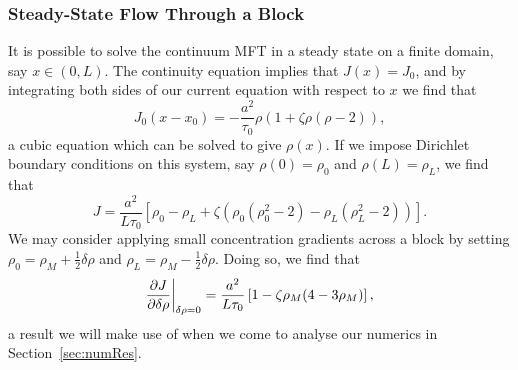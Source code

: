 \subsubsection{Steady-State Flow Through a Block}
It is possible to solve the continuum MFT in a steady state on a finite domain, say $x\in(0, L)$. The continuity equation implies that $J(x)=J_0$, and by integrating both sides of our current equation with respect to $x$ we find that
\begin{equation}
 J_0 (x-x_0) = -\frac{a^2}{\tau_0} \rho \left(1+\zeta \rho\left(\rho-2\right)\right),
\end{equation}
a cubic equation which can be solved to give $\rho(x)$. If we impose Dirichlet boundary conditions on this system, say $\rho(0)=\rho_0$ and $\rho(L)=\rho_L$, we find that
\begin{equation}
 J = \frac{a^2}{L \tau_0} \left[ \rho_0 - \rho_L + \zeta \left( \rho_0\left(\rho_0^2-2\right) - \rho_L\left(\rho_L^2-2\right) \right) \right].
\end{equation}
We may consider applying small concentration gradients across a block by setting $\rho_0 = \rho_M + \frac{1}{2}\delta\rho$ and $\rho_L = \rho_M - \frac{1}{2}\delta\rho$. Doing so, we find that
\begin{equation}
\label{eq:MFTflow}
 \frac{\partial J}{\partial \delta\rho}\bigg|_{\delta\rho=0} = \frac{a^2}{L \tau_0} \left[ 1 - \zeta\rho_M(4-3\rho_M) \right],
\end{equation}
a result we will make use of when we come to analyse our numerics in Section~\ref{sec:numRes}.

